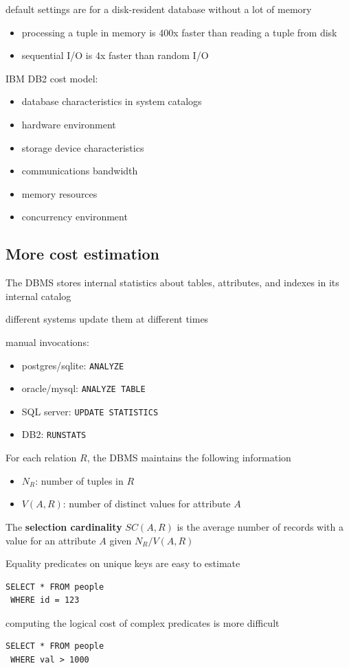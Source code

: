 \documentclass[11pt]{article}
\begin{document}
default settings are for a disk-resident database without a lot of memory
\begin{itemize}
\item processing a tuple in memory is 400x faster than reading a tuple from disk
\item sequential I/O is 4x faster than random I/O
\end{itemize}

IBM DB2 cost model:
\begin{itemize}
\item database characteristics in system catalogs
\item hardware environment
\item storage device characteristics
\item communications bandwidth
\item memory resources
\item concurrency environment
\end{itemize}
\subsection{More cost estimation}
\label{sec:org242b298}
The DBMS stores internal statistics about tables, attributes, and indexes in its internal
catalog

different systems update them at different times

manual invocations:
\begin{itemize}
\item postgres/sqlite: \texttt{ANALYZE}
\item oracle/mysql: \texttt{ANALYZE TABLE}
\item SQL server: \texttt{UPDATE STATISTICS}
\item DB2: \texttt{RUNSTATS}
\end{itemize}

For each relation \(R\), the DBMS maintains the following information
\begin{itemize}
\item \(N_R\): number of tuples in \(R\)
\item \(V(A,R)\): number of distinct values for attribute \(A\)
\end{itemize}

The \textbf{selection cardinality} \(SC(A,R)\) is the average number of records with a value for an
attribute \(A\) given \(N_R/V(A,R)\)

Equality predicates on unique keys are easy to estimate
\begin{verbatim}
SELECT * FROM people
 WHERE id = 123
\end{verbatim}
computing the logical cost of complex predicates is more difficult
\begin{verbatim}
SELECT * FROM people
 WHERE val > 1000
\end{verbatim}
\end{document}
